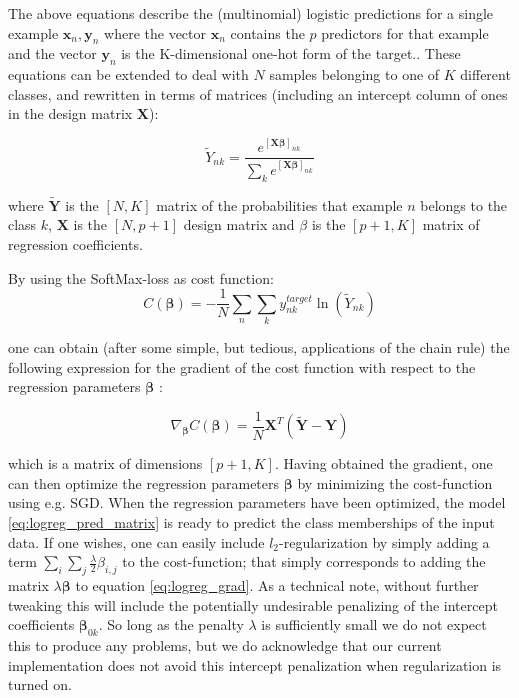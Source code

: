 \documentclass[reprint, english, nofootinbib]{revtex4-2}
\begin{document}
The above equations describe the (multinomial) logistic predictions for a single example $\mathbf{x}_n, \mathbf{y}_n$ where the vector $\mathbf{x}_n$ contains the $p$ predictors for that example and the vector $\mathbf{y}_n$ is the K-dimensional one-hot form of the target.. These equations can be extended to deal with $N$ samples belonging to one of $K$ different classes, and rewritten in terms of matrices (including an intercept column of ones in the design matrix $\mathbf{X}$):

\begin{equation}
\label{eq:logreg_pred_matrix}
\tilde{Y}_{nk} = \frac{ e^{[\mathbf{X} \mathbf{\beta}]_{nk}}} { \sum_k e^{[\mathbf{X} \mathbf{\beta}]_{nk}} }
\end{equation}

where $\mathbf{\tilde{Y}}$ is the $[N,K]$ matrix of the probabilities that example $n$ belongs to the class $k$, $\mathbf{X}$ is the $[N,p+1]$ design matrix and $\mathbb{\beta}$ is the $[p+1,K]$ matrix of regression coefficients.

By using the SoftMax-loss as cost function:
\begin{equation}
\label{eq:logreg_cost}
C(\mathbf{\beta}) = - \frac{1}{N} \sum_n \sum_k y^{target}_{nk}  \ln (\tilde{Y}_{nk})
\end{equation}

one can obtain (after some simple, but tedious, applications of the chain rule) the following expression for the gradient of the cost function with respect to the regression parameters $\mathbf{\beta}$ :

 \begin{equation}
\label{eq:logreg_grad}
\nabla_{\mathbf{\beta}} C(\mathbf{\beta}) = \frac{1}{N} \mathbf{X}^T (\mathbf{\tilde{Y}} - \mathbf{Y} )
\end{equation}

which is a matrix of dimensions $[p+1, K]$. Having obtained the gradient, one can then optimize the regression parameters $\mathbf{\beta}$ by minimizing the cost-function using e.g. SGD. When the regression parameters have been optimized, the model \ref{eq:logreg_pred_matrix} is ready to predict the class memberships of the input data. If one wishes, one can easily include $l_2$-regularization by simply adding a term $\sum_{i} \sum_{j} \frac{\lambda}{2} \beta_{i,j}$ to the cost-function; that simply corresponds to adding the matrix $\lambda \mathbf{\beta}$ to equation \ref{eq:logreg_grad}. As a technical note, without further tweaking this will include the potentially undesirable penalizing of the intercept coefficients $\mathbf{\beta}_{0k}$. So long as the penalty $\lambda$ is sufficiently small we do not expect this to produce any problems, but we do acknowledge that our current implementation does not avoid this intercept penalization when regularization is turned on.
\end{document}
